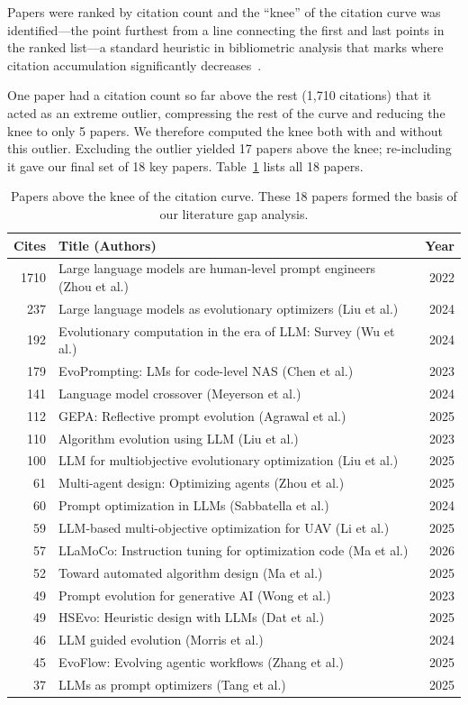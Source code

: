 \documentclass[sigconf,nonacm]{acmart}
\begin{document}
Papers were ranked by citation count and the ``knee'' of the citation curve was identified---the point furthest from a line connecting the first and last points in the ranked list---a standard heuristic in bibliometric analysis that marks where citation accumulation significantly decreases~\cite{menzies2024moot}.

One paper had a citation count so far above the rest (1,710 citations) that it acted as an extreme outlier, compressing the rest of the curve and reducing the knee to only 5 papers. We therefore computed the knee both with and without this outlier. Excluding the outlier yielded 17 papers above the knee; re-including it gave our final set of 18 key papers. Table~\ref{tab:knee-papers} lists all 18 papers.

\begin{table}[h]
\caption{Papers above the knee of the citation curve. These 18 papers formed the basis of our literature gap analysis.}
\label{tab:knee-papers}
\small
\begin{tabular}{rp{5.5cm}r}
\toprule
\textbf{Cites} & \textbf{Title (Authors)} & \textbf{Year} \\
\midrule
1710 & Large language models are human-level prompt engineers (Zhou et al.) & 2022 \\
237  & Large language models as evolutionary optimizers (Liu et al.) & 2024 \\
192  & Evolutionary computation in the era of LLM: Survey (Wu et al.) & 2024 \\
179  & EvoPrompting: LMs for code-level NAS (Chen et al.) & 2023 \\
141  & Language model crossover (Meyerson et al.) & 2024 \\
112  & GEPA: Reflective prompt evolution (Agrawal et al.) & 2025 \\
110  & Algorithm evolution using LLM (Liu et al.) & 2023 \\
100  & LLM for multiobjective evolutionary optimization (Liu et al.) & 2025 \\
61   & Multi-agent design: Optimizing agents (Zhou et al.) & 2025 \\
60   & Prompt optimization in LLMs (Sabbatella et al.) & 2024 \\
59   & LLM-based multi-objective optimization for UAV (Li et al.) & 2025 \\
57   & LLaMoCo: Instruction tuning for optimization code (Ma et al.) & 2026 \\
52   & Toward automated algorithm design (Ma et al.) & 2025 \\
49   & Prompt evolution for generative AI (Wong et al.) & 2023 \\
49   & HSEvo: Heuristic design with LLMs (Dat et al.) & 2025 \\
46   & LLM guided evolution (Morris et al.) & 2024 \\
45   & EvoFlow: Evolving agentic workflows (Zhang et al.) & 2025 \\
37   & LLMs as prompt optimizers (Tang et al.) & 2025 \\
\bottomrule
\end{tabular}
\end{table}
\end{document}
